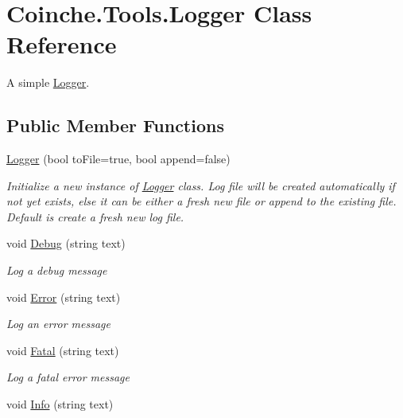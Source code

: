 \hypertarget{class_coinche_1_1_tools_1_1_logger}{}\section{Coinche.\+Tools.\+Logger Class Reference}
\label{class_coinche_1_1_tools_1_1_logger}


A simple \hyperlink{class_coinche_1_1_tools_1_1_logger}{Logger}.  


\subsection*{Public Member Functions}
\begin{DoxyCompactItemize}
\item 
\hyperlink{class_coinche_1_1_tools_1_1_logger_a2e3e986856697b6a0bd807e2ad491ecd}{Logger} (bool to\+File=true, bool append=false)
\begin{DoxyCompactList}\small\item\em Initialize a new instance of \hyperlink{class_coinche_1_1_tools_1_1_logger}{Logger} class. Log file will be created automatically if not yet exists, else it can be either a fresh new file or append to the existing file. Default is create a fresh new log file. \end{DoxyCompactList}\item 
void \hyperlink{class_coinche_1_1_tools_1_1_logger_a5e58c9a36a174cb4288591e7e94edf62}{Debug} (string text)
\begin{DoxyCompactList}\small\item\em Log a debug message \end{DoxyCompactList}\item 
void \hyperlink{class_coinche_1_1_tools_1_1_logger_a7f5ed11e008b28da749c517e39aaaff0}{Error} (string text)
\begin{DoxyCompactList}\small\item\em Log an error message \end{DoxyCompactList}\item 
void \hyperlink{class_coinche_1_1_tools_1_1_logger_a7a65b085b7e419cc629732be31ef7932}{Fatal} (string text)
\begin{DoxyCompactList}\small\item\em Log a fatal error message \end{DoxyCompactList}\item 
void \hyperlink{class_coinche_1_1_tools_1_1_logger_a49e8cfceab5aa777003d22cf33ecc4a1}{Info} (string text)

\end{DoxyCompactItemize}
